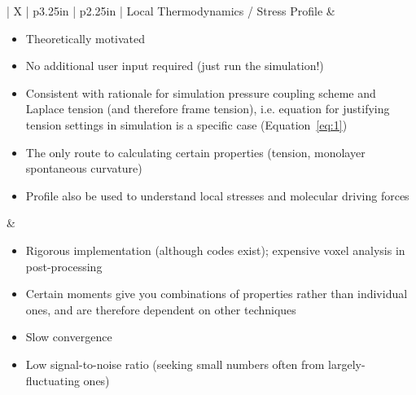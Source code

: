 \documentclass[9pt,bestpractices,pubversion]{livecoms}
\begin{document}
\begin{table}[!htp]
\begin{tabularx}{\linewidth}{| X | p{3.25in} | p{2.25in} |}
Local Thermodynamics / Stress Profile & \begin{minipage}[t]{\linewidth} \begin{itemize}[nosep,after=\strut] \item Theoretically motivated \item No additional user input required (just run the simulation!) \item Consistent with rationale for simulation pressure coupling scheme and Laplace tension (and therefore frame tension), i.e. equation for justifying tension settings in simulation is a specific case (Equation~\ref{eq:1}) \item The only route to calculating certain properties (tension, monolayer spontaneous curvature) \item Profile also be used to understand local stresses and molecular driving forces \end{itemize} \end{minipage} & \begin{minipage}[t]{\linewidth} \begin{itemize}[nosep,after=\strut] \item Rigorous implementation (although codes exist); expensive voxel analysis in post-processing \item Certain moments give you combinations of properties rather than individual ones, and are therefore dependent on other techniques \item Slow convergence \item Low signal-to-noise ratio (seeking small numbers often from largely-fluctuating ones) \end{itemize} \end{minipage} \\
\hline

\end{tabularx}
\end{table}
\end{document}
